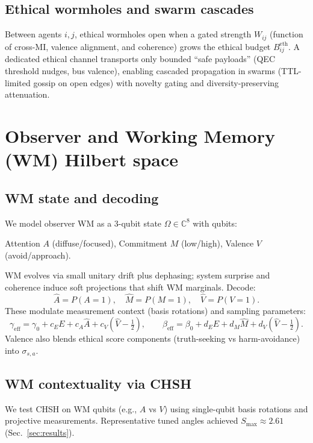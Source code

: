 \documentclass[11pt]{article}
\begin{document}
\subsection{Ethical wormholes and swarm cascades}
Between agents $i,j$, ethical wormholes open when a gated strength $W_{ij}$ (function of cross-MI, valence alignment, and coherence) grows the ethical budget $B^{\mathrm{eth}}_{ij}$. A dedicated ethical channel transports only bounded ``safe payloads'' (QEC threshold nudges, bus valence), enabling cascaded propagation in swarms (TTL-limited gossip on open edges) with novelty gating and diversity-preserving attenuation.

\section{Observer and Working Memory (WM) Hilbert space}
\label{sec:wm}
\subsection{WM state and decoding}
We model observer WM as a 3-qubit state $\Omega\in\mathbb{C}^{8}$ with qubits:
\begin{center}
Attention $A$ (diffuse/focused), Commitment $M$ (low/high), Valence $V$ (avoid/approach).
\end{center}
WM evolves via small unitary drift plus dephasing; system surprise and coherence induce soft projections that shift WM marginals. Decode:
\begin{equation}
\hat A = P(A=1),\quad \hat M=P(M=1),\quad \hat V=P(V=1).
\end{equation}
These modulate measurement context (basis rotations) and sampling parameters:
\begin{equation}
\gamma_{\mathrm{eff}} = \gamma_0 + c_E E + c_A \hat A + c_V(\hat V-\tfrac12),\qquad
\beta_{\mathrm{eff}}  = \beta_0  + d_E E + d_M \hat M + d_V(\hat V-\tfrac12).
\end{equation}
Valence also blends ethical score components (truth-seeking vs harm-avoidance) into $\sigma_{s,a}$.

\subsection{WM contextuality via CHSH}
We test CHSH on WM qubits (e.g., $A$ vs $V$) using single-qubit basis rotations and projective measurements. Representative tuned angles achieved $S_{\max}\approx 2.61$ (Sec.~\ref{sec:results}).
\end{document}
